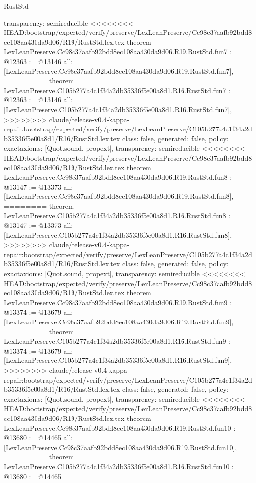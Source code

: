 \begin{lexlean}{RustStd}
\begin{coremodule}
{\begin{coremodule}
{{{{{{{{{{  transparency: semireducible
}
<<<<<<<< HEAD:bootstrap/expected/verify/preserve/LexLeanPreserve/Cc98c37aafb92bdd8ec108aa430da9d06/R19/RustStd.lex.tex
theorem LexLeanPreserve.Cc98c37aafb92bdd8ec108aa430da9d06.R19.RustStd.fun7 : @12363 := @13146 {
  all: [LexLeanPreserve.Cc98c37aafb92bdd8ec108aa430da9d06.R19.RustStd.fun7],
========
theorem LexLeanPreserve.C105b277a4c1f34a2db35336f5e00a8d1.R16.RustStd.fun7 : @12363 := @13146 {
  all: [LexLeanPreserve.C105b277a4c1f34a2db35336f5e00a8d1.R16.RustStd.fun7],
>>>>>>>> claude/release-v0.4-kappa-repair:bootstrap/expected/verify/preserve/LexLeanPreserve/C105b277a4c1f34a2db35336f5e00a8d1/R16/RustStd.lex.tex
  class: false,
  generated: false,
  policy: exact{axioms: [Quot.sound, propext]},
  transparency: semireducible
}
<<<<<<<< HEAD:bootstrap/expected/verify/preserve/LexLeanPreserve/Cc98c37aafb92bdd8ec108aa430da9d06/R19/RustStd.lex.tex
theorem LexLeanPreserve.Cc98c37aafb92bdd8ec108aa430da9d06.R19.RustStd.fun8 : @13147 := @13373 {
  all: [LexLeanPreserve.Cc98c37aafb92bdd8ec108aa430da9d06.R19.RustStd.fun8],
========
theorem LexLeanPreserve.C105b277a4c1f34a2db35336f5e00a8d1.R16.RustStd.fun8 : @13147 := @13373 {
  all: [LexLeanPreserve.C105b277a4c1f34a2db35336f5e00a8d1.R16.RustStd.fun8],
>>>>>>>> claude/release-v0.4-kappa-repair:bootstrap/expected/verify/preserve/LexLeanPreserve/C105b277a4c1f34a2db35336f5e00a8d1/R16/RustStd.lex.tex
  class: false,
  generated: false,
  policy: exact{axioms: [Quot.sound, propext]},
  transparency: semireducible
}
<<<<<<<< HEAD:bootstrap/expected/verify/preserve/LexLeanPreserve/Cc98c37aafb92bdd8ec108aa430da9d06/R19/RustStd.lex.tex
theorem LexLeanPreserve.Cc98c37aafb92bdd8ec108aa430da9d06.R19.RustStd.fun9 : @13374 := @13679 {
  all: [LexLeanPreserve.Cc98c37aafb92bdd8ec108aa430da9d06.R19.RustStd.fun9],
========
theorem LexLeanPreserve.C105b277a4c1f34a2db35336f5e00a8d1.R16.RustStd.fun9 : @13374 := @13679 {
  all: [LexLeanPreserve.C105b277a4c1f34a2db35336f5e00a8d1.R16.RustStd.fun9],
>>>>>>>> claude/release-v0.4-kappa-repair:bootstrap/expected/verify/preserve/LexLeanPreserve/C105b277a4c1f34a2db35336f5e00a8d1/R16/RustStd.lex.tex
  class: false,
  generated: false,
  policy: exact{axioms: [Quot.sound, propext]},
  transparency: semireducible
}
<<<<<<<< HEAD:bootstrap/expected/verify/preserve/LexLeanPreserve/Cc98c37aafb92bdd8ec108aa430da9d06/R19/RustStd.lex.tex
theorem LexLeanPreserve.Cc98c37aafb92bdd8ec108aa430da9d06.R19.RustStd.fun10 : @13680 := @14465 {
  all: [LexLeanPreserve.Cc98c37aafb92bdd8ec108aa430da9d06.R19.RustStd.fun10],
========
theorem LexLeanPreserve.C105b277a4c1f34a2db35336f5e00a8d1.R16.RustStd.fun10 : @13680 := @14465 {
}}}}}}}}}}}}}}
\end{coremodule}}
\end{coremodule}
\end{lexlean}
